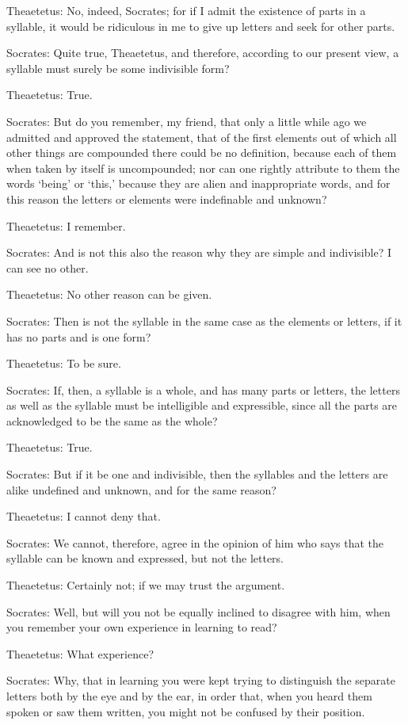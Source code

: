 Theaetetus: No, indeed, Socrates; for if I admit the existence of parts
in a syllable, it would be ridiculous in me to give up letters and seek
for other parts.

Socrates: Quite true, Theaetetus, and therefore, according to our
present view, a syllable must surely be some indivisible form?

Theaetetus: True.

Socrates: But do you remember, my friend, that only a little while ago
we admitted and approved the statement, that of the first elements out
of which all other things are compounded there could be no definition,
because each of them when taken by itself is uncompounded; nor can one
rightly attribute to them the words `being' or `this,' because they
are alien and inappropriate words, and for this reason the letters or
elements were indefinable and unknown?

Theaetetus: I remember.

Socrates: And is not this also the reason why they are simple and
indivisible? I can see no other.

Theaetetus: No other reason can be given.

Socrates: Then is not the syllable in the same case as the elements or
letters, if it has no parts and is one form?

Theaetetus: To be sure.

Socrates: If, then, a syllable is a whole, and has many parts or
letters, the letters as well as the syllable must be intelligible and
expressible, since all the parts are acknowledged to be the same as the
whole?

Theaetetus: True.

Socrates: But if it be one and indivisible, then the syllables and the
letters are alike undefined and unknown, and for the same reason?

Theaetetus: I cannot deny that.

Socrates: We cannot, therefore, agree in the opinion of him who says
that the syllable can be known and expressed, but not the letters.

Theaetetus: Certainly not; if we may trust the argument.

Socrates: Well, but will you not be equally inclined to disagree with
him, when you remember your own experience in learning to read?

Theaetetus: What experience?

Socrates: Why, that in learning you were kept trying to distinguish the
separate letters both by the eye and by the ear, in order that, when
you heard them spoken or saw them written, you might not be confused by
their position.

